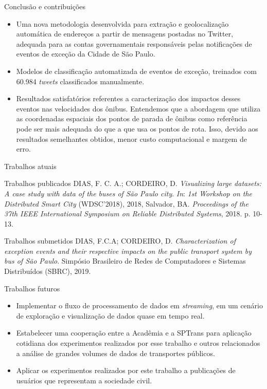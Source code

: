 \documentclass{beamer}
\begin{document}
\begin{frame}{Conclusão e contribuições}
\begin{itemize}
\item Uma nova metodologia desenvolvida para extração e geolocalização automática de endereços a partir de mensagens postadas no Twitter, adequada para as contas governamentais responsáveis pelas notificações de eventos de exceção da Cidade de São Paulo.
\item  Modelos de classificação automatizada de eventos de exceção,  treinados com 60.984 \textit{tweets} classificados manualmente.
\item Resultados satisfatórios referentes a caracterização dos impactos desses eventos nas velocidades dos ônibus. Entendemos que a abordagem que utiliza as coordenadas espaciais dos pontos de parada de ônibus como referência pode ser mais adequada do que a que usa os pontos de rota. Isso, devido aos resultados semelhantes obtidos, menor custo computacional e margem de erro. 
\end{itemize}
\end{frame}
\begin{frame}{Trabalhos atuais}
\begin{block}{Trabalhos publicados}
DIAS, F. C. A.; CORDEIRO, D. \textit{Visualizing large datasets: A case study with data of the buses of São Paulo city}. \textit{In}: \textit{1st Workshop on the Distributed Smart City} (WDSC'2018), 2018, Salvador, BA. \textit{Proceedings of the 37th IEEE International Symposium on Reliable Distributed Systems}, 2018. p. 10-13.
\end{block}

\begin{block}{Trabalhos submetidos}
DIAS, F.C.A; CORDEIRO, D. \textit{Characterization of exception events and their respective impacts on the public transport system by bus of São Paulo}. Simpósio Brasileiro de Redes de Computadores e Sistemas Distribuídos (SBRC), 2019.
\end{block}
\end{frame}
\begin{frame}{Trabalhos futuros}
\begin{itemize}
\item Implementar o fluxo de processamento de dados em \textit{streaming}, em um cenário de exploração e visualização de dados quase em tempo real.
\item Estabelecer uma cooperação entre a Acadêmia e a SPTrans para aplicação cotidiana dos experimentos realizados por esse trabalho e outros relacionados a análise de grandes volumes de dados de transportes públicos.
\item Aplicar os experimentos realizados por este trabalho a publicações de usuários que representam a sociedade civil.
\end{itemize}
\end{frame}
\end{document}

